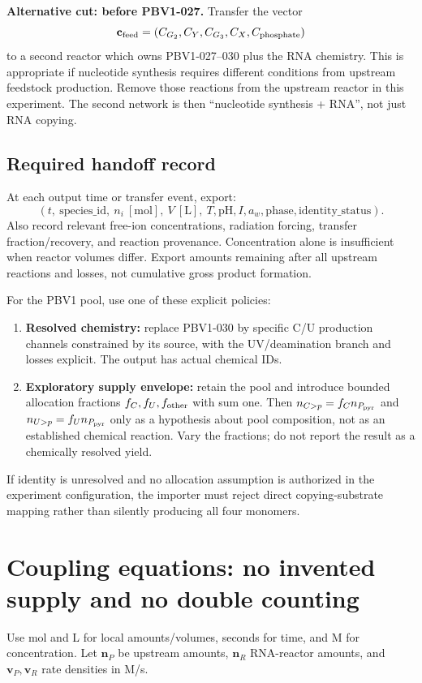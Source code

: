 \documentclass[11pt]{article}
\newcommand{\cp}{\mathord{>}p}
\begin{document}
\textbf{Alternative cut: before PBV1-027.} Transfer the vector
\begin{equation}
\mathbf c_{\rm feed}=(C_{G_2},C_Y,C_{G_3},C_X,C_{\rm phosphate})
\end{equation}
to a second reactor which owns PBV1-027--030 plus the RNA chemistry. This is
appropriate if nucleotide synthesis requires different conditions from upstream
feedstock production. Remove those reactions from the upstream reactor in this
experiment. The second network is then ``nucleotide synthesis + RNA'', not just
RNA copying.

\subsection{Required handoff record}
At each output time or transfer event, export:
\begin{equation}
(t,\ \mathrm{species\_id},\ n_i\ [\mathrm{mol}],\ V\ [\mathrm L],\
T,\mathrm{pH},I,a_w,\mathrm{phase},\mathrm{identity\_status}).
\end{equation}
Also record relevant free-ion concentrations, radiation forcing, transfer
fraction/recovery, and reaction provenance. Concentration alone is insufficient
when reactor volumes differ. Export amounts remaining after all upstream
reactions and losses, not cumulative gross product formation.

For the PBV1 pool, use one of these explicit policies:
\begin{enumerate}
\item \textbf{Resolved chemistry:} replace PBV1-030 by specific C/U production
channels constrained by its source, with the UV/deamination branch and losses
explicit. The output has actual chemical IDs.
\item \textbf{Exploratory supply envelope:} retain the pool and introduce bounded
allocation fractions $f_C,f_U,f_{\rm other}$ with sum one. Then
$n_{C\cp}=f_C n_{P_{\rm pyr}}$ and $n_{U\cp}=f_U n_{P_{\rm pyr}}$ only as a
hypothesis about pool composition, not as an established chemical reaction.
Vary the fractions; do not report the result as a chemically resolved yield.
\end{enumerate}
If identity is unresolved and no allocation assumption is authorized in the
experiment configuration, the importer must reject direct copying-substrate
mapping rather than silently producing all four monomers.

\section{Coupling equations: no invented supply and no double counting}
Use mol and L for local amounts/volumes, seconds for time, and M for concentration.
Let $\mathbf n_P$ be upstream amounts, $\mathbf n_R$ RNA-reactor amounts,
and $\mathbf v_P,\mathbf v_R$ rate densities in M/s.
\end{document}
